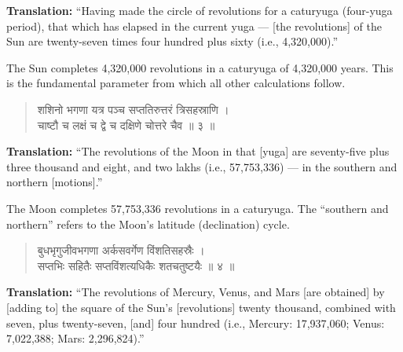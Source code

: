 \documentclass[11pt,a4paper]{article}
\newcommand{\dev}[1]{{\devanagarifont #1}}
\newenvironment{sanskritverse}{\begin{verse}\devanagarifont\large\centering}{\end{verse}}
\begin{document}
\vspace{0.3cm}
\noindent\textbf{Translation:} ``Having made the circle of revolutions for a caturyuga (four-yuga period), that which has elapsed in the current yuga --- [the revolutions] of the Sun are twenty-seven times four hundred plus sixty (i.e., 4,320,000).''

\smallskip
\noindent The Sun completes 4,320,000 revolutions in a caturyuga of 4,320,000 years. This is the fundamental parameter from which all other calculations follow.

\vspace{0.5cm}

\begin{tcolorbox}[colback=white,colframe=rulecolor,title={\dev{\textbf{दशगीतिका ३ — चन्द्रमार्गलबुधजीवभगणाः}}}]
\begin{sanskritverse}
\dev{शशिनो भगणा यत्र पञ्च सप्ततिरुत्तरं त्रिसहस्राणि ।\\
चाष्टौ च लक्षं च द्वे च दक्षिणे चोत्तरे चैव ॥ ३ ॥}
\end{sanskritverse}
\end{tcolorbox}

\vspace{0.3cm}
\noindent\textbf{Translation:} ``The revolutions of the Moon in that [yuga] are seventy-five plus three thousand and eight, and two lakhs (i.e., 57,753,336) --- in the southern and northern [motions].''

\smallskip
\noindent The Moon completes 57,753,336 revolutions in a caturyuga. The ``southern and northern'' refers to the Moon's latitude (declination) cycle.

\vspace{0.5cm}

\begin{tcolorbox}[colback=white,colframe=rulecolor,title={\dev{\textbf{दशगीतिका ४ — शुक्रबुधरौहिणेयभृगुभगणाः}}}]
\begin{sanskritverse}
\dev{बुधभृगुजीवभगणा अर्कसवर्गेण विंशतिसहस्रैः ।\\
सप्तभिः सहितैः सप्तविंशत्यधिकैः शतचतुष्टयैः ॥ ४ ॥}
\end{sanskritverse}
\end{tcolorbox}

\vspace{0.3cm}
\noindent\textbf{Translation:} ``The revolutions of Mercury, Venus, and Mars [are obtained] by [adding to] the square of the Sun's [revolutions] twenty thousand, combined with seven, plus twenty-seven, [and] four hundred (i.e., Mercury: 17,937,060; Venus: 7,022,388; Mars: 2,296,824).''
\end{document}
